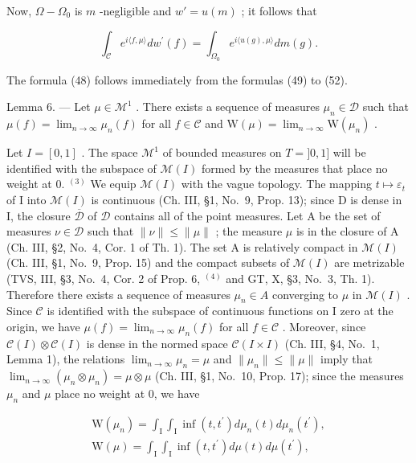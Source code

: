 Now, \(\Omega - \Omega_0\) is \(m\) -negligible and \(w' = u(m)\) ; it follows that

\[
\int_ {\mathcal {C}} e ^ {i \langle f, \mu \rangle} d w ^ {\prime} (f) = \int_ {\Omega_ {0}} e ^ {i \langle u (g), \mu \rangle} d m (g).\tag{52}
\]

The formula (48) follows immediately from the formulas (49) to (52).

Lemma 6. --- Let \(\mu \in \mathcal{M}^1\) . There exists a sequence of measures \(\mu_n \in \mathcal{D}\) such that \(\mu(f) = \lim_{n \to \infty} \mu_n(f)\) for all \(f \in \mathcal{C}\) and \(\mathrm{W}(\mu) = \lim_{n \to \infty} \mathrm{W}(\mu_n)\) .

Let \(I = [0,1]\) . The space \(\mathcal{M}^1\) of bounded measures on \(T = ]0,1]\) will be identified with the subspace of \(\mathcal{M}(I)\) formed by the measures that place no weight at 0. \(^{(3)}\) We equip \(\mathcal{M}(I)\) with the vague topology. The mapping \(t \mapsto \varepsilon_t\) of I into \(\mathcal{M}(I)\) is continuous (Ch. III, §1, No.~9, Prop. 13); since D is dense in I, the closure \(\overline{\mathcal{D}}\) of \(\mathcal{D}\) contains all of the point measures. Let A be the set of measures \(\nu \in \mathcal{D}\) such that \(\| \nu \| \leqslant \| \mu \|\) ; the measure \(\mu\) is in the closure of A (Ch. III, §2, No.~4, Cor. 1 of Th. 1). The set A is relatively compact in \(\mathcal{M}(I)\) (Ch. III, §1, No.~9, Prop. 15) and the compact subsets of \(\mathcal{M}(I)\) are metrizable (TVS, III, §3, No.~4, Cor. 2 of Prop. 6, \(^{(4)}\) and GT, X, §3, No.~3, Th. 1). Therefore there exists a sequence of measures \(\mu_n \in A\) converging to \(\mu\) in \(\mathcal{M}(I)\) . Since \(\mathcal{C}\) is identified with the subspace of continuous functions on I zero at the origin, we have \(\mu(f) = \lim_{n \to \infty} \mu_n(f)\) for all \(f \in \mathcal{C}\) . Moreover, since \(\mathcal{C}(I) \otimes \mathcal{C}(I)\) is dense in the normed space \(\mathcal{C}(I \times I)\) (Ch. III, §4, No.~1, Lemma 1), the relations \(\lim_{n \to \infty} \mu_n = \mu\) and \(\| \mu_n \| \leqslant \| \mu \|\) imply that \(\lim_{n \to \infty} (\mu_n \otimes \mu_n) = \mu \otimes \mu\) (Ch. III, §1, No.~10, Prop. 17); since the measures \(\mu_n\) and \(\mu\) place no weight at 0, we have

\[
\begin{array}{r} \mathrm{W} (\mu_ {n}) = \int_ {\mathrm{I}} \int_ {\mathrm{I}} \inf (t, t ^ {\prime}) d \mu_ {n} (t) d \mu_ {n} (t ^ {\prime}), \\ \mathrm{W} (\mu) = \int_ {\mathrm{I}} \int_ {\mathrm{I}} \inf (t, t ^ {\prime}) d \mu (t) d \mu (t ^ {\prime}), \end{array}
\]

